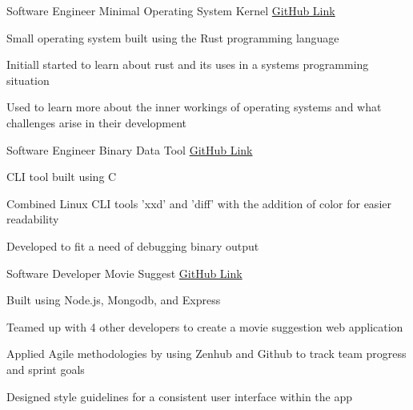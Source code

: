 

\begin{cventries}

  \cventry
    {Software Engineer} %
    {Minimal Operating System Kernel} %
    {\href{https://github.com/shawnz99/popcorn}{GitHub Link}} %
    {} %
    {
      \begin{cvitems} %
        \item Small operating system built using the Rust programming language
        \item Initiall started to learn about rust and its uses in a systems programming situation
        \item Used to learn more about the inner workings of operating systems and what challenges arise in their development
      \end{cvitems}
    }

   \cventry
     {Software Engineer} %
     {Binary Data Tool} %
     {\href{https://github.com/shawnz99/bdt}{GitHub Link}} %
     {} %
     {
       \begin{cvitems} %
        \item CLI tool built using C 
        \item Combined Linux CLI tools 'xxd' and 'diff' with the addition of color for easier readability
        \item Developed to fit a need of debugging binary output
       \end{cvitems}
     }

  \cventry
    {Software Developer} %
    {Movie Suggest} %
    {\href{https://github.com/shawnz99/CSE442-A5-GroupProject}{GitHub Link}} %
    {} %
    {
      \begin{cvitems} %
        \item Built using Node.js, Mongodb, and Express
        \item Teamed up with 4 other developers to create a movie suggestion web application
        \item Applied Agile methodologies by using Zenhub and Github to track team progress and sprint goals
        \item Designed style guidelines for a consistent user interface within the app
      \end{cvitems}
    }

\end{cventries}
